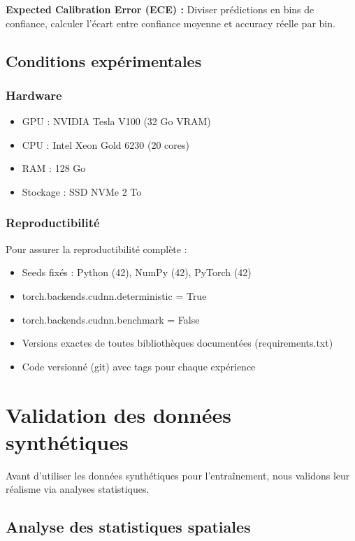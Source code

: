 \textbf{Expected Calibration Error (ECE) :}
Diviser prédictions en bins de confiance, calculer l'écart entre confiance moyenne et accuracy réelle par bin.

\subsection{Conditions expérimentales}

\subsubsection{Hardware}

\begin{itemize}
    \item GPU : NVIDIA Tesla V100 (32 Go VRAM)
    \item CPU : Intel Xeon Gold 6230 (20 cores)
    \item RAM : 128 Go
    \item Stockage : SSD NVMe 2 To
\end{itemize}

\subsubsection{Reproductibilité}

Pour assurer la reproductibilité complète :
\begin{itemize}
    \item Seeds fixés : Python (42), NumPy (42), PyTorch (42)
    \item torch.backends.cudnn.deterministic = True
    \item torch.backends.cudnn.benchmark = False
    \item Versions exactes de toutes bibliothèques documentées (requirements.txt)
    \item Code versionné (git) avec tags pour chaque expérience
\end{itemize}

\section{Validation des données synthétiques}

Avant d'utiliser les données synthétiques pour l'entraînement, nous validons leur réalisme via analyses statistiques.

\subsection{Analyse des statistiques spatiales}

